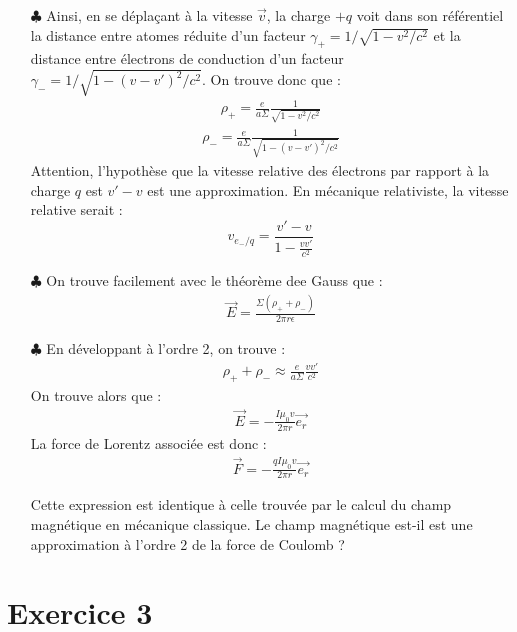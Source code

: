 \documentclass{report}
\begin{document}
	\begin{itemize}
	
		\item[$\clubsuit$] Ainsi, en se déplaçant à la vitesse $\vec{v}$, la charge $+q$ voit dans son référentiel la distance entre atomes réduite d'un facteur $\gamma_{+}=1/\sqrt{1-v^{2}/c^{2}}$ et la distance entre électrons de conduction d'un facteur $\gamma_{-}=1/\sqrt{1-(v-v')^{2}/c^{2}}$. 
		On trouve donc que :
		\begin{align*}
			\rho_+=\frac{e}{a\Sigma}\frac{1}{\sqrt{1-v^{2}/c^{2}}}
		\end{align*}
		\begin{align*}
			\rho_-=\frac{e}{a\Sigma}\frac{1}{\sqrt{1-(v-v')^{2}/c^{2}}}
		\end{align*}		
		Attention, l'hypothèse que la vitesse relative des électrons par rapport à la charge $q$ est $v'-v$ est une approximation. En mécanique relativiste, la vitesse relative serait :
		\begin{equation}
			v_{e_-/q}=\frac{v'-v}{1-\frac{vv'}{c^2}}
		\end{equation}
		
	\item[$\clubsuit$] On trouve facilement avec le théorème dee Gauss que :
	\begin{align*}
		\vec{E}=\frac{\Sigma(\rho_++\rho_-)}{2\pi r\epsilon}
	\end{align*}
	
	\item[$\clubsuit$] En développant à l'ordre 2, on trouve :
	\begin{align*}
		\rho_++\rho_-\approx \frac{e}{a\Sigma}\frac{vv'}{c^2}
	\end{align*}
	On trouve alors que :
	\begin{align*}
		\vec{E}=-\frac{I\mu_0 v}{2\pi r}\vec{e_r}
	\end{align*}
	La force de Lorentz associée est donc :
	\begin{align*}
		\vec{F}=-\frac{qI\mu_0 v}{2\pi r}\vec{e_r}
	\end{align*}
	
	Cette expression est identique à celle trouvée par le calcul du champ magnétique en mécanique classique. Le champ magnétique est-il est une approximation à l'ordre 2 de la force de Coulomb ? 
	\end{itemize}

\section*{Exercice 3}
\end{document}
